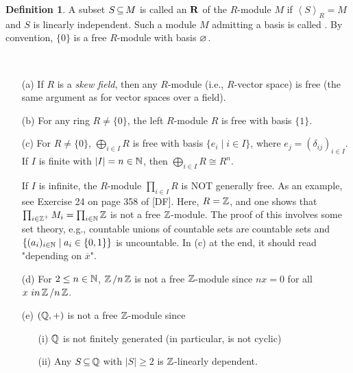 \documentclass[11pt]{book}
\theoremstyle{definition}   \newtheorem{defn}[counter]{Definition} %
\newcommand{\ov}{\overline}   \newcommand{\wt}{\widetilde}
\newcommand{\gen}[1]{\left\langle #1 \right\rangle}   \newcommand{\stab}[2]{\tn{Stab}_{#1}(#2)}   \newcommand{\fix}[2]{\tn{Fix}_{#1}(#2)}   \newcommand{\op}{^{\tn{op}}}
\newcommand{\vs}{\vspace{8pt}}
\numberwithin{counter}{chapter}
\begin{document}
\begin{defn}
A subset $S \operatorname{\subseteq} M$ is called an $\mathbf{R}$ of the $R$-module $M$ if $\gen{S}_R = M$ and $S$ is linearly independent. Such a module $M$ admitting a basis is called . By convention, $\{0\}$ is a free $R$-module with basis $\varnothing$. 
\end{defn}

\vs

\begin{example}\ 
\begin{enumerate}
\item[(a)] If $R$ is a \emph{skew field}, then any $R$-module (i.e., $R$-vector space) is free (the same argument as for vector spaces over a field).
\item[(b)] For any ring $R \ne \{0\}$, the left $R$-module $R$ is free with basis $\{1\}$.
\item[(c)] For $R \ne \{0\}$, $\bigoplus_{i \in I} R$ is free with basis $\{e_i \mid i \in I\}$, where $e_j = (\delta_{ij})_{i \in I}$. If $I$ is finite with $|I| = n \in \operatorname{\mathbb{N}}$, then $\bigoplus_{i \in I} R \cong R^n$. 

 If $I$ is infinite, the $R$-module $\prod_{i \in I} R$ is NOT generally free. As an example, see Exercise 24 on page 358 of [DF]. Here, $R = \operatorname{\mathbb{Z}}$, and one shows that $\prod_{i \in \operatorname{\mathbb{Z}}^+} M_i = \prod_{i \in \operatorname{\mathbb{N}}} \operatorname{\mathbb{Z}}$ is not a free $\operatorname{\mathbb{Z}}$-module. The proof of this involves some set theory, e.g., countable unions of countable sets are countable sets and $\{(a_i)_{i \in \operatorname{\mathbb{N}}} \mid a_i \in \{0,1\}\}$ is uncountable. In (c) at the end, it should read "depending on $\ov{x}$".

\item[(d)] For $2 \leq n \in \operatorname{\mathbb{N}}$, $\operatorname{\mathbb{Z}} / n\operatorname{\mathbb{Z}}$ is not a free $\operatorname{\mathbb{Z}}$-module since $n x = 0$ for all $x\ in \operatorname{\mathbb{Z}} / n\operatorname{\mathbb{Z}}$. 

\item[(e)] $(\operatorname{\mathbb{Q}},+)$ is not a free $\operatorname{\mathbb{Z}}$-module since
	\begin{enumerate}
	\item[(i)] $\operatorname{\mathbb{Q}}$ is not finitely generated (in particular, is not cyclic)
	\item[(ii)] Any $S \operatorname{\subseteq} \operatorname{\mathbb{Q}}$ with $|S| \geq 2$ is $\operatorname{\mathbb{Z}}$-linearly dependent.
	\end{enumerate}
\end{enumerate}
\end{example}

\vs
\end{document}
